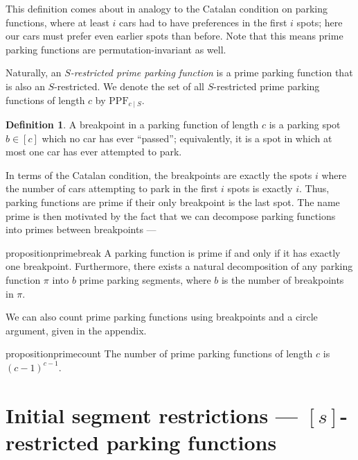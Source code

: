 \documentclass[12 pt]{amsart}
\theoremstyle{definition} %
\newtheorem{definition}[theorem]{Definition}
\theoremstyle{remark} %
\begin{document}
This definition comes about in analogy to the Catalan condition on parking functions, where at least $i$ cars had to have preferences in the first $i$ spots; here our cars must prefer even earlier spots than before. Note that this means prime parking functions are permutation-invariant as well.

Naturally, an \emph{$S$-restricted prime parking function} is a prime parking function that is also an $S$-restricted. We denote the set of all $S$-restricted prime parking functions of length $c$ by $\mathrm{PPF}_{c \mid S}$.

\begin{definition}
    A breakpoint in a parking function of length $c$ is a parking spot $b\in[c]$ which no car has ever ``passed''; equivalently, it is a spot in which at most one car has ever attempted to park.
\end{definition}

In terms of the Catalan condition, the breakpoints are exactly the spots $i$ where the number of cars attempting to park in the first $i$ spots is exactly $i$. Thus, parking functions are prime if their only breakpoint is the last spot. The name prime is then motivated by the fact that we can decompose parking functions into primes between breakpoints ---

\begin{restatable}{proposition}{primebreak}
    A parking function is prime if and only if it has exactly one breakpoint. Furthermore, there exists a natural decomposition of any parking function $\pi$ into $b$ prime parking segments, where $b$ is the number of breakpoints in $\pi$.
\end{restatable}

We can also count prime parking functions using breakpoints and a circle argument, given in the appendix.

\begin{restatable}{proposition}{primecount}
    The number of prime parking functions of length $c$ is $(c-1)^{c-1}$.
\end{restatable}

\section{\texorpdfstring{Initial segment restrictions --- $[s]$-restricted parking functions}{Initial segment restrictions}} \label{s:init-res}
\end{document}
